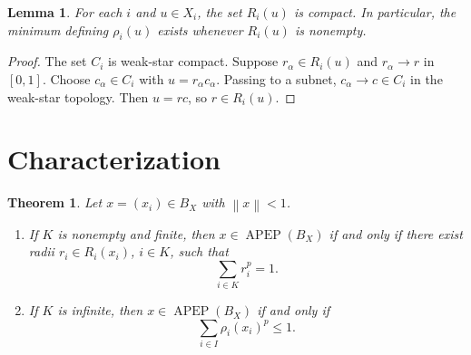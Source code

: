\documentclass[11pt]{article}
\newtheorem{theorem}{Theorem}
\newtheorem{lemma}{Lemma}
\newcommand{\APEP}{\operatorname{APEP}}
\newcommand{\Ball}{B}
\newcommand{\norm}[1]{\left\lVert #1 \right\rVert}
\begin{document}
\begin{lemma}
For each $i$ and $u\in X_i$, the set $R_i(u)$ is compact. In particular,
the minimum defining $\rho_i(u)$ exists whenever $R_i(u)$ is nonempty.
\end{lemma}

\begin{proof}
The set $C_i$ is weak-star compact. Suppose $r_\alpha\in R_i(u)$ and
$r_\alpha\to r$ in $[0,1]$. Choose $c_\alpha\in C_i$ with
$u=r_\alpha c_\alpha$. Passing to a subnet, $c_\alpha\to c\in C_i$ in the
weak-star topology. Then $u=rc$, so $r\in R_i(u)$.
\end{proof}

\section*{Characterization}

\begin{theorem}
Let $x=(x_i)\in\Ball_X$ with $\norm{x}<1$.

\begin{enumerate}
\item If $K$ is nonempty and finite, then $x\in\APEP(\Ball_X)$ if and
only if there exist radii $r_i\in R_i(x_i)$, $i\in K$, such that
\[
  \sum_{i\in K} r_i^p=1.
\]

\item If $K$ is infinite, then $x\in\APEP(\Ball_X)$ if and only if
\[
  \sum_{i\in I}\rho_i(x_i)^p\le 1.
\]
\end{enumerate}
\end{theorem}
\end{document}
